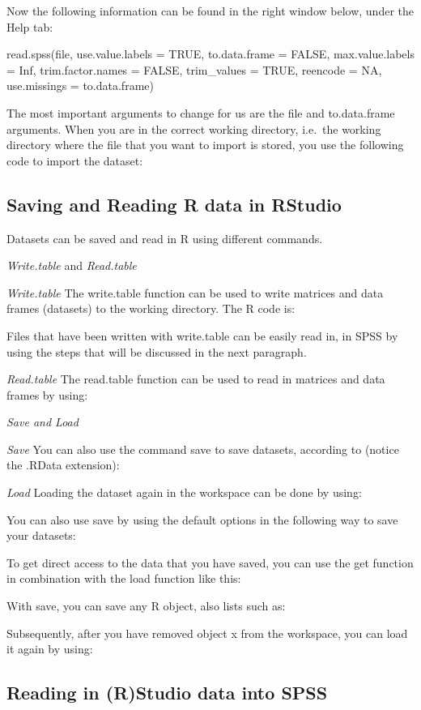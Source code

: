 \documentclass[]{book}
\begin{document}
Now the following information can be found in the right window below,
under the Help tab:

read.spss(file, use.value.labels = TRUE, to.data.frame = FALSE,
max.value.labels = Inf, trim.factor.names = FALSE, trim\_values = TRUE,
reencode = NA, use.missings = to.data.frame)

The most important arguments to change for us are the file and
to.data.frame arguments. When you are in the correct working directory,
i.e.~the working directory where the file that you want to import is
stored, you use the following code to import the dataset:

\subsection{Saving and Reading R data in
RStudio}\label{saving-and-reading-r-data-in-rstudio}

Datasets can be saved and read in R using different commands.

\emph{Write.table} and \emph{Read.table}

\emph{Write.table} The write.table function can be used to write
matrices and data frames (datasets) to the working directory. The R code
is:

Files that have been written with write.table can be easily read in, in
SPSS by using the steps that will be discussed in the next paragraph.

\emph{Read.table} The read.table function can be used to read in
matrices and data frames by using:

\emph{Save and Load}

\emph{Save} You can also use the command save to save datasets,
according to (notice the .RData extension):

\emph{Load} Loading the dataset again in the workspace can be done by
using:

You can also use save by using the default options in the following way
to save your datasets:

To get direct access to the data that you have saved, you can use the
get function in combination with the load function like this:

With save, you can save any R object, also lists such as:

Subsequently, after you have removed object x from the workspace, you
can load it again by using:

\subsection{Reading in (R)Studio data into
SPSS}\label{reading-in-rstudio-data-into-spss}
\end{document}
